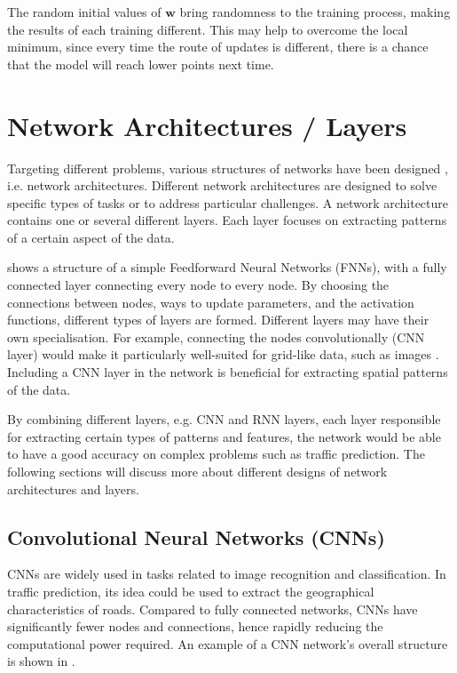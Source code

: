 The random initial values of $\mathbf{w}$ bring randomness to the training process, making the results of each training different. 
This may help to overcome the local minimum, since every time the route of updates is different, there is a chance that the model will reach lower points next time. 

\section{Network Architectures / Layers}

Targeting different problems, various structures of networks have been designed \cite{Bishop}, i.e. network architectures. 
Different network architectures are designed to solve specific types of tasks or to address particular challenges.
A network architecture contains one or several different layers. Each layer focuses on extracting patterns of a certain aspect of the data. 

 shows a structure of a simple Feedforward Neural Networks (FNNs), with a fully connected layer connecting every node to every node. 
By choosing the connections between nodes, ways to update parameters, and the activation functions, different types of layers are formed.  
Different layers may have their own specialisation. 
For example, connecting the nodes convolutionally (CNN layer) would make it particularly well-suited for grid-like data, such as images \cite{726791}. Including a CNN layer in the network is beneficial for extracting spatial patterns of the data.

By combining different layers, e.g. CNN and RNN layers, each layer responsible for extracting certain types of patterns and features, the network would be able to have a good accuracy on complex problems such as traffic prediction.
The following sections will discuss more about different designs of network architectures and layers.

\subsection{Convolutional Neural Networks (CNNs)}

CNNs are widely used in tasks related to image recognition and classification. In traffic prediction, its idea could be used to extract the geographical characteristics of roads. 
Compared to fully connected networks, CNNs have significantly fewer nodes and connections, hence rapidly reducing the computational power required. 
An example of a CNN network's overall structure is shown in .


